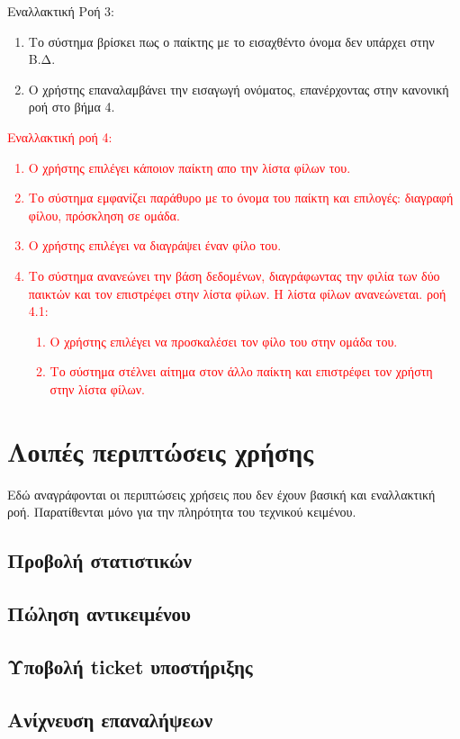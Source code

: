 Εναλλακτική Ροή 3:
\begin{enumerate}[label=5.\alph*.,ref=5.\alph*]
\item Το σύστημα βρίσκει πως ο παίκτης με το εισαχθέντο όνομα δεν υπάρχει στην Β.Δ.
\item Ο χρήστης επαναλαμβάνει την εισαγωγή ονόματος, επανέρχοντας στην κανονική ροή στο βήμα 4.
\end{enumerate}

\textcolor{red}{
Εναλλακτική ροή 4:
\begin{enumerate}
[label=4.\alph*.,ref=4.\alph*]
\item Ο χρήστης επιλέγει κάποιον παίκτη απο την λίστα φίλων του.
\item Το σύστημα εμφανίζει παράθυρο με το όνομα του παίκτη και επιλογές: διαγραφή φίλου, πρόσκληση σε ομάδα.
\item Ο χρήστης επιλέγει να διαγράψει έναν φίλο του.
\item Το σύστημα ανανεώνει την βάση δεδομένων, διαγράφωντας την φιλία των δύο παικτών και τον επιστρέφει στην λίστα φίλων. Η λίστα φίλων ανανεώνεται.
 ροή 4.1:
\begin{enumerate}[label=4.3.\alph*.,ref=4.3.\alph*]
\item Ο χρήστης επιλέγει να προσκαλέσει τον φίλο του στην ομάδα του.
\item Το σύστημα στέλνει αίτημα στον άλλο παίκτη και επιστρέφει τον χρήστη στην λίστα φίλων.
\end{enumerate}
\end{enumerate}
}

\newpage
\section{Λοιπές περιπτώσεις χρήσης}
Εδώ αναγράφονται οι περιπτώσεις χρήσεις που δεν έχουν βασική και εναλλακτική ροή. Παρατίθενται μόνο για την πληρότητα του τεχνικού κειμένου.
\subsection{Προβολή στατιστικών}
\subsection{Πώληση αντικειμένου}
\subsection{Υποβολή ticket υποστήριξης}
\subsection{Ανίχνευση επαναλήψεων}
